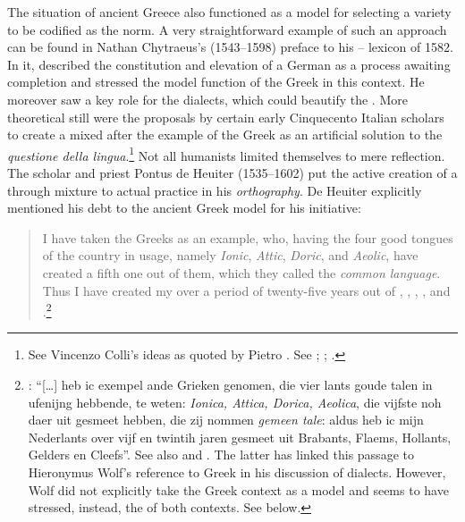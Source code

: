 The situation of ancient Greece also functioned as a model for selecting a variety to be codified as the  norm. A very straightforward example of such an approach can be found in Nathan Chytraeus’s (1543–1598) preface to his – lexicon of 1582. In it, \citet[\textsc{a.3}\textsc{\textsuperscript{r}}\textsc{–a.3}\textsc{\textsuperscript{v}}]{Chytraeus1582} described the constitution and elevation of a German  as a process awaiting completion and stressed the model function of the Greek  in this context. He moreover saw a key role for the dialects, which could beautify the . More theoretical still were the proposals by certain early Cinquecento Italian scholars to create a mixed  after the example of the Greek  as an artificial solution to the \textit{questione della lingua}.\footnote{See Vincenzo Colli’s ideas as quoted by Pietro \citet[\textsc{xii}\textsc{\textsuperscript{v}}\textsc{–xiii}\textsc{\textsuperscript{r}}]{Bembo1525}. See \citet[119]{Melzi1966}; \citet[215--218]{Trovato1984}; \citet[12]{Trapp1990}.} Not all humanists limited themselves to mere reflection. The  scholar and priest Pontus de Heuiter (1535–1602) put the active creation of a   through mixture to actual practice in his \textit{ orthography}. De Heuiter explicitly mentioned his debt to the ancient Greek model for his initiative:

\begin{quote}
I have taken the Greeks as an example, who, having the four good tongues of the country in usage, namely \textit{Ionic}, \textit{Attic}, \textit{Doric}, and \textit{Aeolic}, have created a fifth one out of them, which they called the \textit{common language}. Thus I have created my  over a period of twenty-five years out of , , , , and .\footnote{: “[…] heb ic exempel ande Grieken genomen, die vier lants goude talen in ufenijng hebbende, te weten: \textit{Ionica, Attica, Dorica, Aeolica}, die vijfste noh daer uit gesmeet hebben, die zij nommen \textit{gemeen tale}: aldus heb ic mijn Nederlants over vijf en twintih jaren gesmeet uit Brabants, Flaems, Hollants, Gelders en Cleefs”. See also \citet[110]{Dibbets2008} and \citet[13--14]{De1917}. The latter has linked this passage to Hieronymus Wolf’s reference to Greek in his discussion of  dialects. However, Wolf did not explicitly take the Greek context as a model and seems to have stressed, instead, the  of both contexts. See  below.}
\end{quote}


